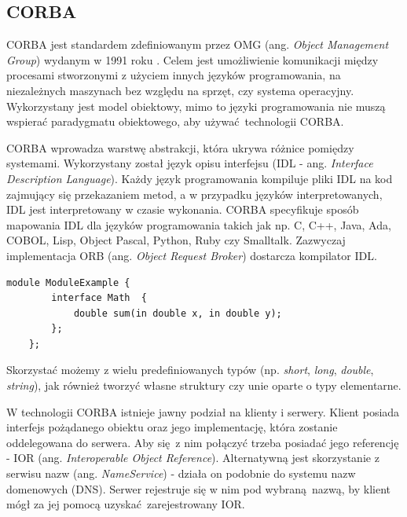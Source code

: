 \subsection{CORBA}

CORBA jest standardem zdefiniowanym przez OMG (ang. \textit{Object Management Group}) wydanym w 1991 roku \cite{CORBA}. Celem jest umożliwienie komunikacji między procesami stworzonymi z użyciem innych języków programowania, na niezależnych maszynach bez względu na sprzęt, czy systema operacyjny. Wykorzystany jest model obiektowy, mimo to języki programowania nie muszą wspierać paradygmatu obiektowego, aby używać technologii CORBA.

CORBA wprowadza warstwę abstrakcji, która ukrywa różnice pomiędzy systemami. Wykorzystany został język opisu interfejsu (IDL - ang. \textit{Interface Description Language}). Każdy język programowania kompiluje pliki IDL na kod zajmujący się przekazaniem metod, a w przypadku języków interpretowanych, IDL jest interpretowany w czasie wykonania. CORBA specyfikuje sposób mapowania IDL dla języków programowania takich jak np. C, C++, Java, Ada, COBOL, Lisp, Object Pascal, Python, Ruby czy Smalltalk. Zazwyczaj implementacja ORB (ang. \textit{Object Request Broker}) dostarcza kompilator IDL.


\begin{lstlisting}[caption={Przykład użycia IDL},captionpos=b]
    module ModuleExample {
        interface Math  {
            double sum(in double x, in double y);
        };
    };
\end{lstlisting}


Skorzystać możemy z wielu predefiniowanych typów (np. \textit{short}, \textit{long}, \textit{double}, \textit{string}), jak również tworzyć własne struktury czy unie oparte o typy elementarne.

W technologii CORBA istnieje jawny podział na klienty i serwery. Klient posiada interfejs pożądanego obiektu oraz jego implementację, która zostanie oddelegowana do serwera. Aby się z nim połączyć trzeba posiadać jego referencję - IOR (ang. \textit{Interoperable Object Reference}). Alternatywną jest skorzystanie z serwisu nazw (ang. \textit{NameService}) - działa on podobnie do systemu nazw domenowych (DNS). Serwer rejestruje się w nim pod wybraną nazwą, by klient mógł za jej pomocą uzyskać zarejestrowany IOR.

